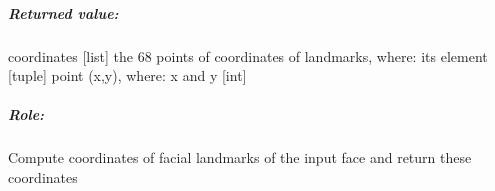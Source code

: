 \subparagraph{Returned value:}
\begin{changemargin}{1cm}{0cm}
	coordinates [list] the 68 points of coordinates of landmarks, where: its element [tuple] point (x,y), where: x and y [int]
\end{changemargin}

\subparagraph{Role:}
\begin{changemargin}{1cm}{0cm}
	Compute coordinates of facial landmarks of the input face and return these coordinates
\end{changemargin}